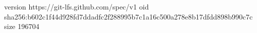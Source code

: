 version https://git-lfs.github.com/spec/v1
oid sha256:b602c1f44d928fd7ddadfc2f288995b7c1a16c500a278e8b17dfdd898b990c7c
size 196704
